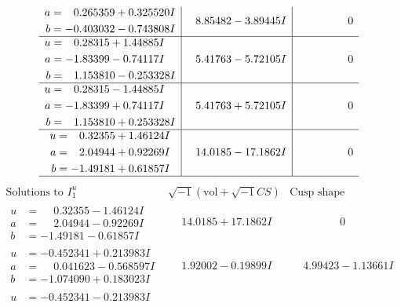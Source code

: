 \documentclass[1p]{elsarticle_modified}
\theoremstyle{definition}
\newcommand{\I}{\sqrt{-1}}
\begin{document}
$$\begin{array}{c|c|c}
\begin{aligned}
a &= \phantom{-}0.265359 + 0.325520 I \\
b &= -0.403032 - 0.743808 I\end{aligned}
 & \phantom{-}8.85482 - 3.89445 I & \phantom{-0.000000 } 0 \\ \hline\begin{aligned}
u &= \phantom{-}0.28315 + 1.44885 I \\
a &= -1.83399 - 0.74117 I \\
b &= \phantom{-}1.153810 - 0.253328 I\end{aligned}
 & \phantom{-}5.41763 - 5.72105 I & \phantom{-0.000000 } 0 \\ \hline\begin{aligned}
u &= \phantom{-}0.28315 - 1.44885 I \\
a &= -1.83399 + 0.74117 I \\
b &= \phantom{-}1.153810 + 0.253328 I\end{aligned}
 & \phantom{-}5.41763 + 5.72105 I & \phantom{-0.000000 } 0 \\ \hline\begin{aligned}
u &= \phantom{-}0.32355 + 1.46124 I \\
a &= \phantom{-}2.04944 + 0.92269 I \\
b &= -1.49181 + 0.61857 I\end{aligned}
 & \phantom{-}14.0185 - 17.1862 I & \phantom{-0.000000 } 0\\
 \hline 
 \end{array}$$\newpage$$\begin{array}{c|c|c}  
\text{Solutions to }I^u_{1}& \I (\text{vol} + \sqrt{-1}CS) & \text{Cusp shape}\\
 \hline 
\begin{aligned}
u &= \phantom{-}0.32355 - 1.46124 I \\
a &= \phantom{-}2.04944 - 0.92269 I \\
b &= -1.49181 - 0.61857 I\end{aligned}
 & \phantom{-}14.0185 + 17.1862 I & \phantom{-0.000000 } 0 \\ \hline\begin{aligned}
u &= -0.452341 + 0.213983 I \\
a &= \phantom{-}0.041623 - 0.568597 I \\
b &= -1.074090 + 0.183023 I\end{aligned}
 & \phantom{-}1.92002 - 0.19899 I & \phantom{-}4.99423 - 1.13661 I \\ \hline\begin{aligned}
u &= -0.452341 - 0.213983 I \\

\end{aligned}
\end{array}$$
\end{document}
